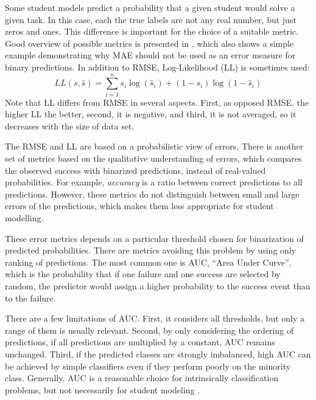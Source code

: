 Some student models predict a probability that
  a given student would solve a given task.
In this case, each the true labels are not any real number,
  but just zeros and ones.
This difference is important for the choice of a suitable metric.
Good overview of possible metrics is presented in \cite{pelanek-evaluation-student-models},
  which also shows a simple example demonstrating why MAE should not be used
  as an error measure for binary predictions.
In addition to RMSE, Log-Likelihood (LL) is sometimes used:
$$
LL(s, \hat{s}) = \sum_{i=1}^n s_i\log(\hat{s}_i) + (1-s_i)\log(1-\hat{s}_i)
$$
Note that LL differs from RMSE in several aspects.
First, as opposed RMSE, the higher LL the better,
second, it is negative,
and third, it is not averaged, so it decreases with the size of data set.

The RMSE and LL are based on a probabilistic view of errors.
There is another set of metrics based on the qualitative understanding of errors,
  which compares the observed success with binarized predictions,
  instead of real-valued probabilities.
For example, \emph{accuracy} is a ratio between correct predictions to all predictions.
However, these metrics do not distinguish between small and large errors of the predictions,
  which makes them less appropriate for student modelling.


These error metrics depends on a particular threshold chosen
  for binarization of predicted probabilities.
There are metrics avoiding this problem by using only ranking of predictions.
The most common one is AUC, ``Area Under Curve'',
  which is the probability that if one failure and one success are selected by random,
  the predictor would assign a higher probability to the success event than to the failure.

There are a few limitations of AUC.
First, it considers all thresholds, but only a range of them is usually relevant.
Second, by only considering the ordering of predictions,
  if all predictions are multiplied by a constant, AUC remains unchanged.
Third, if the predicted classes are strongly imbalanced,
  high AUC can be achieved by simple classifiers
  even if they perform poorly on the minority class.
Generally, AUC is a reasonable choice for intrinsically classification problems,
  but not necessarily for student modeling \cite{pelanek-evaluation-student-models}.

